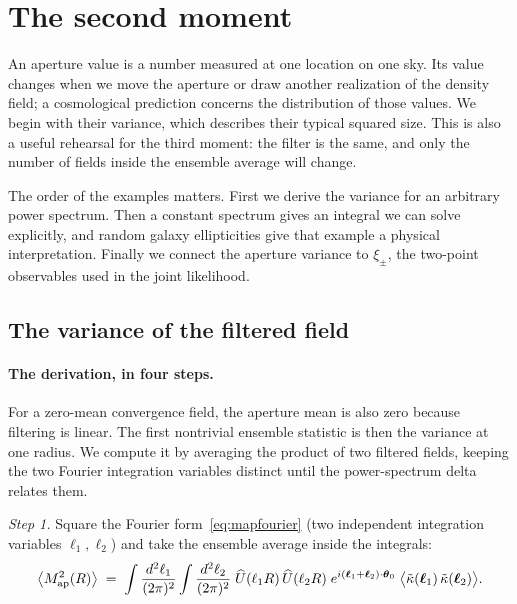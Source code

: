 \documentclass[11pt]{article}
\newcommand{\Map}{M_{\rm ap}}
\newcommand{\Uhat}{\widehat{U}}
\newcommand{\btheta}{\boldsymbol{\theta}}
\newcommand{\bell}{\boldsymbol{\ell}}
\numberwithin{equation}{section}
\begin{document}
\section{The second moment}
\label{sec:map2}

An aperture value is a number measured at one location on one sky. Its
value changes when we move the aperture or draw another realization of
the density field; a cosmological prediction concerns the distribution
of those values. We begin with their variance, which describes their
typical squared size. This is also a useful rehearsal for the third
moment: the filter is the same, and only the number of fields inside the
ensemble average will change.

The order of the examples matters. First we derive the variance for an
arbitrary power spectrum. Then a constant spectrum gives an integral we
can solve explicitly, and random galaxy ellipticities give that example
a physical interpretation. Finally we connect the aperture variance to
$\xi_\pm$, the two-point observables used in the joint likelihood.

\subsection{The variance of the filtered field}
\label{sec:map2deriv}

\paragraph{The derivation, in four steps.}
For a zero-mean convergence field, the aperture mean is also zero
because filtering is linear. The first nontrivial ensemble statistic is
then the variance at one radius. We compute it by averaging the product
of two filtered fields, keeping the two Fourier integration variables
distinct until the power-spectrum delta relates them.

\emph{Step 1.}  Square the Fourier form~\eqref{eq:mapfourier} (two
independent integration variables $\bell_1, \bell_2$) and take the
ensemble average inside the integrals:
\begin{equation}
  \bigl\langle \Map^2(R) \bigr\rangle
  \;=\;
  \int \frac{d^2\ell_1}{(2\pi)^2}
  \int \frac{d^2\ell_2}{(2\pi)^2}\;
  \Uhat(\ell_1 R)\,\Uhat(\ell_2 R)\;
  e^{i(\bell_1 + \bell_2)\cdot\btheta_0}\;
  \bigl\langle \tilde\kappa(\bell_1)\,\tilde\kappa(\bell_2)
  \bigr\rangle .
  \label{eq:map2step1}
\end{equation}
\end{document}
